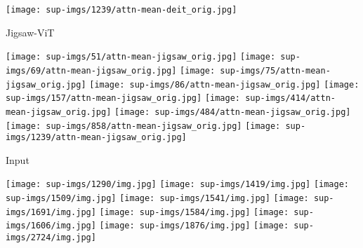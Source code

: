 \documentclass{article}
\begin{document}
\begin{figure*}[ht]
\begin{minipage}{0.9\textwidth}
		\texttt{[image: sup-imgs/1239/attn-mean-deit\_orig.jpg]}
		\end{minipage}\hfill
		\begin{minipage}{0.1\textwidth}
		\centering
		\footnotesize{Jigsaw-ViT}
		\end{minipage}\hfill
		\begin{minipage}{0.9\textwidth}
		\centering
		\texttt{[image: sup-imgs/51/attn-mean-jigsaw\_orig.jpg]}
		\texttt{[image: sup-imgs/69/attn-mean-jigsaw\_orig.jpg]}
		\texttt{[image: sup-imgs/75/attn-mean-jigsaw\_orig.jpg]}
		\texttt{[image: sup-imgs/86/attn-mean-jigsaw\_orig.jpg]}
		\texttt{[image: sup-imgs/157/attn-mean-jigsaw\_orig.jpg]}
		\texttt{[image: sup-imgs/414/attn-mean-jigsaw\_orig.jpg]}
		\texttt{[image: sup-imgs/484/attn-mean-jigsaw\_orig.jpg]}
		\texttt{[image: sup-imgs/858/attn-mean-jigsaw\_orig.jpg]}
		\texttt{[image: sup-imgs/1239/attn-mean-jigsaw\_orig.jpg]}
		\end{minipage}
		\begin{minipage}{0.1\textwidth}
		\centering
		\footnotesize{Input}
		\end{minipage}\hfill
		\begin{minipage}{0.9\textwidth}
		\centering
		\texttt{[image: sup-imgs/1290/img.jpg]}
		\texttt{[image: sup-imgs/1419/img.jpg]}
		\texttt{[image: sup-imgs/1509/img.jpg]}
		\texttt{[image: sup-imgs/1541/img.jpg]}
		\texttt{[image: sup-imgs/1691/img.jpg]}
		\texttt{[image: sup-imgs/1584/img.jpg]}
		\texttt{[image: sup-imgs/1606/img.jpg]}
		\texttt{[image: sup-imgs/1876/img.jpg]}
		\texttt{[image: sup-imgs/2724/img.jpg]}
		\end{minipage}\hfill
\begin{minipage}{0.1\textwidth}

\end{minipage}
\end{figure*}
\end{document}
